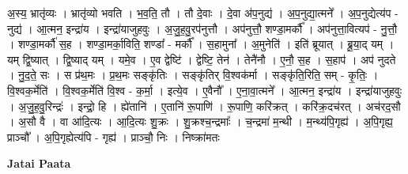 \documentclass[17pt]{extarticle}
\begin{document}
अ॒स्य॒ भ्रातृ॑व्यः । भ्रातृ॑व्यो भवति । भ॒व॒ति॒ तौ । तौ दे॒वाः । दे॒वा अ॑प॒नुद्य॑ । अ॒प॒नुद्या॒त्मने᳚ । अ॒प॒नुद्येत्य॑प - नुद्य॑ । आ॒त्मन॒ इन्द्रा॑य । इन्द्रा॑याजुहवुः । अ॒जु॒ह॒वु॒रप॑नुत्तौ । अप॑नुत्तौ॒ शण्डा॒मर्कौ᳚ । अप॑नुत्ता॒वित्यप॑ - नु॒त्तौ॒ । शण्डा॒मर्कौ॑ स॒ह । शण्डा॒मर्का॒विति॒ शण्डा᳚ - मर्कौ᳚ । स॒हामुना᳚ । अ॒मुनेति॑ । इति॑ ब्रूयात् । ब्रू॒या॒द् यम् । यम् द्वि॒ष्यात् । द्वि॒ष्याद् यम् । यमे॒व । ए॒व द्वेष्टि॑ । द्वेष्टि॒ तेन॑ । तेनै॑नौ । ए॒नौ॒ स॒ह । स॒हाप॑ । अप॑ नुदते । नु॒द॒ते॒ सः । स प्र॑थ॒मः । प्र॒थ॒मः सङ्‍कृ॑तिः । सङ्‍कृ॑तिर् वि॒श्वक॑र्मा । सङ्‍कृ॑ति॒रिति॒ सम् - कृ॒तिः॒ । वि॒श्वक॒र्मेति॑ । वि॒श्वक॒र्मेति॑ वि॒श्व - क॒र्मा॒ । इत्ये॒व । ए॒वैनौ᳚ । ए॒ना॒वा॒त्मने᳚ । आ॒त्मन॒ इन्द्रा॑य । इन्द्रा॑याजुहवुः । अ॒जु॒ह॒वु॒रिन्द्रः॑ । इन्द्रो॒ हि । ह्ये॑तानि॑ । ए॒तानि॑ रू॒पाणि॑ । रू॒पाणि॒ करि॑क्रत् । करि॑क्र॒दच॑रत् । अच॑रद॒सौ । अ॒सौ वै । वा आ॑दि॒त्यः । आ॒दि॒त्यः शु॒क्रः । शु॒क्रश्च॒न्द्रमाः᳚ । च॒न्द्रमा॑ म॒न्थी । म॒न्थ्य॑पि॒गृह्य॑ । अ॒पि॒गृह्य॒ प्राञ्चौ᳚ । अ॒पि॒गृह्येत्य॑पि - गृह्य॑ । प्राञ्चौ॒ निः । निष्क्रा॑मतः \newline

\textbf{Jatai Paata} \newline
\end{document}
